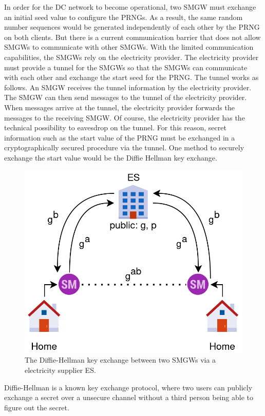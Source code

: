 In order for the DC network to become operational, two \gls{SMGW} must exchange an initial seed value to configure the \gls{PRNG}s. %
As a result, the same random number sequences would be generated independently of each other by the \gls{PRNG} on both clients. But there is a current communication barrier that does not allow \gls{SMGW}s to communicate with other \gls{SMGW}s. With the limited communication capabilities, the \gls{SMGW}s rely on the electricity provider. The electricity provider must provide a tunnel for the \gls{SMGW}s so that the \gls{SMGW}s can communicate with each other and exchange the start seed for the \gls{PRNG}. The tunnel works as follows. An \gls{SMGW} receives the tunnel information by the electricity provider. The \gls{SMGW} can then send messages to the tunnel of the electricity provider. When messages arrive at the tunnel, the electricity provider forwards the messages to the receiving \gls{SMGW}. Of course, the electricity provider has the technical possibility to eavesdrop on the tunnel. For this reason, secret information such as the start value of the \gls{PRNG} must be exchanged in a cryptographically secured procedure via the tunnel. One method to securely exchange the start value would be the Diffie Hellman key exchange.\\
\begin{figure}[tbp]
  \centering
  \includegraphics[scale=0.7]{images/key_exchange2.png}
  \caption[Diffie-Hellman Key Exchange in TR-03109]{The Diffie-Hellman key exchange between two SMGWs via a electricity supplier \gls{ES}.}
  \label{fig:keyexchange}
\end{figure}Diffie-Hellman is a known key exchange protocol, where two users can publicly exchange a secret over a unsecure channel without a third person being able to figure out the secret. 
